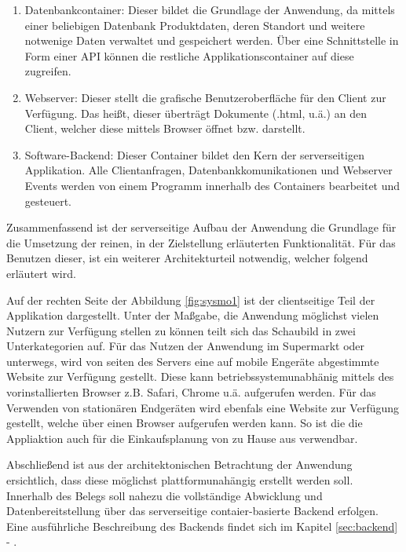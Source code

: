 \begin{enumerate}[leftmargin=*]
\item Datenbankcontainer: Dieser bildet die Grundlage der Anwendung, da mittels einer beliebigen Datenbank Produktdaten, deren Standort
      und weitere notwenige Daten verwaltet und gespeichert werden. Über eine Schnittstelle in Form einer \ac{API} können die restliche 
      Applikationscontainer auf diese zugreifen.

\item Webserver: Dieser stellt die grafische Benutzeroberfläche für den Client zur Verfügung. Das heißt, dieser überträgt Dokumente (.html, u.ä.)
      an den Client, welcher diese mittels Browser öffnet bzw. darstellt.

\item Software-Backend: Dieser Container bildet den Kern der serverseitigen Applikation. Alle Clientanfragen, Datenbankkomunikationen
      und Webserver Events werden von einem Programm innerhalb des Containers bearbeitet und gesteuert.      
\end{enumerate}

Zusammenfassend ist der serverseitige Aufbau der Anwendung die Grundlage für die Umsetzung der reinen, in der Zielstellung erläuterten 
Funktionalität. Für das Benutzen dieser, ist ein weiterer Architekturteil notwendig, welcher folgend erläutert wird.

Auf der rechten Seite der Abbildung \ref{fig:sysmo1} ist der clientseitige Teil der Applikation dargestellt. Unter der Maßgabe, 
die Anwendung möglichst vielen Nutzern zur Verfügung stellen zu können teilt sich das Schaubild in zwei Unterkategorien auf. 
Für das Nutzen der Anwendung im Supermarkt oder unterwegs, wird von seiten des Servers eine auf mobile Engeräte abgestimmte Website 
zur Verfügung gestellt. Diese kann betriebssystemunabhänig mittels des vorinstallierten Browser z.B. Safari, Chrome u.ä. aufgerufen werden.
Für das Verwenden von stationären Endgeräten wird ebenfals eine Website zur Verfügung gestellt, welche über einen Browser aufgerufen werden kann.
So ist die die Appliaktion auch für die Einkaufsplanung von zu Hause aus verwendbar. 


Abschließend ist aus der architektonischen Betrachtung der Anwendung ersichtlich, dass diese möglichst plattformunahängig erstellt werden soll.
Innerhalb des Belegs soll nahezu die vollständige Abwicklung und Datenbereitstellung über das serverseitige contaier-basierte Backend erfolgen.
Eine ausführliche Beschreibung des Backends findet sich im Kapitel \ref{sec:backend} - . 


